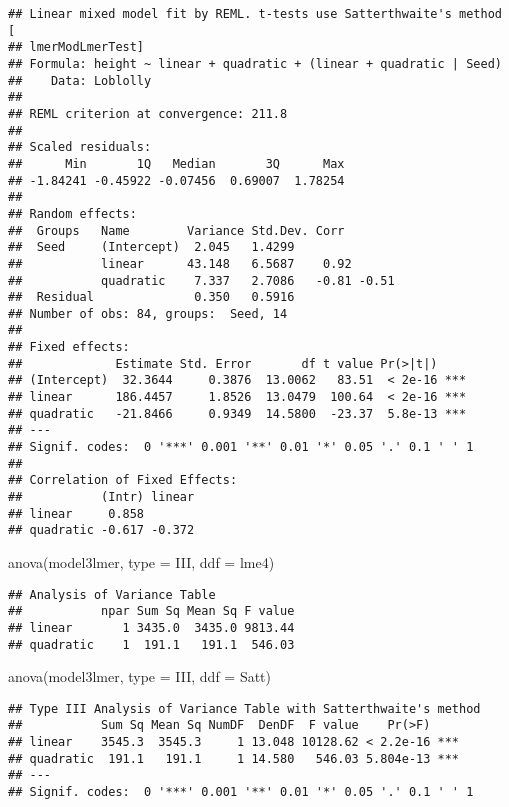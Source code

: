 \documentclass[
]{book}
\newenvironment{Shaded}{\begin{snugshade}}{\end{snugshade}}
\newcommand{\AttributeTok}[1]{\textcolor[rgb]{0.77,0.63,0.00}{#1}}
\newcommand{\FunctionTok}[1]{\textcolor[rgb]{0.00,0.00,0.00}{#1}}
\newcommand{\NormalTok}[1]{#1}
\newcommand{\StringTok}[1]{\textcolor[rgb]{0.31,0.60,0.02}{#1}}
\begin{document}
\begin{verbatim}
## Linear mixed model fit by REML. t-tests use Satterthwaite's method [
## lmerModLmerTest]
## Formula: height ~ linear + quadratic + (linear + quadratic | Seed)
##    Data: Loblolly
## 
## REML criterion at convergence: 211.8
## 
## Scaled residuals: 
##      Min       1Q   Median       3Q      Max 
## -1.84241 -0.45922 -0.07456  0.69007  1.78254 
## 
## Random effects:
##  Groups   Name        Variance Std.Dev. Corr       
##  Seed     (Intercept)  2.045   1.4299              
##           linear      43.148   6.5687    0.92      
##           quadratic    7.337   2.7086   -0.81 -0.51
##  Residual              0.350   0.5916              
## Number of obs: 84, groups:  Seed, 14
## 
## Fixed effects:
##             Estimate Std. Error       df t value Pr(>|t|)    
## (Intercept)  32.3644     0.3876  13.0062   83.51  < 2e-16 ***
## linear      186.4457     1.8526  13.0479  100.64  < 2e-16 ***
## quadratic   -21.8466     0.9349  14.5800  -23.37  5.8e-13 ***
## ---
## Signif. codes:  0 '***' 0.001 '**' 0.01 '*' 0.05 '.' 0.1 ' ' 1
## 
## Correlation of Fixed Effects:
##           (Intr) linear
## linear     0.858       
## quadratic -0.617 -0.372
\end{verbatim}

\begin{Shaded}
\begin{Highlighting}[]
\FunctionTok{anova}\NormalTok{(model3lmer, }\AttributeTok{type =} \StringTok{\textquotesingle{}III\textquotesingle{}}\NormalTok{, }\AttributeTok{ddf =} \StringTok{\textquotesingle{}lme4\textquotesingle{}}\NormalTok{)}
\end{Highlighting}
\end{Shaded}

\begin{verbatim}
## Analysis of Variance Table
##           npar Sum Sq Mean Sq F value
## linear       1 3435.0  3435.0 9813.44
## quadratic    1  191.1   191.1  546.03
\end{verbatim}

\begin{Shaded}
\begin{Highlighting}[]
\FunctionTok{anova}\NormalTok{(model3lmer, }\AttributeTok{type =} \StringTok{\textquotesingle{}III\textquotesingle{}}\NormalTok{, }\AttributeTok{ddf =} \StringTok{\textquotesingle{}Satt\textquotesingle{}}\NormalTok{)}
\end{Highlighting}
\end{Shaded}

\begin{verbatim}
## Type III Analysis of Variance Table with Satterthwaite's method
##           Sum Sq Mean Sq NumDF  DenDF  F value    Pr(>F)    
## linear    3545.3  3545.3     1 13.048 10128.62 < 2.2e-16 ***
## quadratic  191.1   191.1     1 14.580   546.03 5.804e-13 ***
## ---
## Signif. codes:  0 '***' 0.001 '**' 0.01 '*' 0.05 '.' 0.1 ' ' 1
\end{verbatim}
\end{document}
